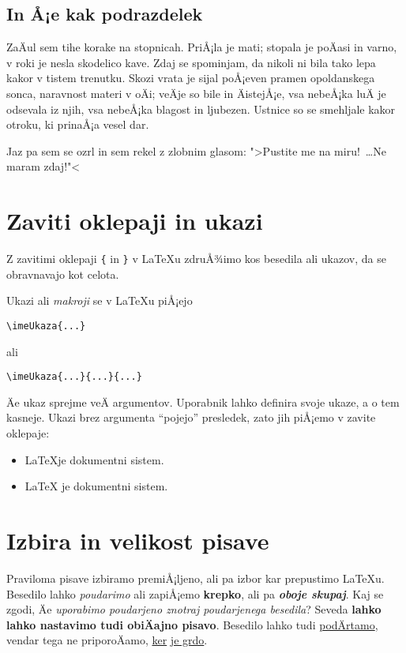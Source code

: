 \documentclass[a4paper]{article}
\begin{document}
\subsection{In Å¡e kak podrazdelek}

ZaÄul sem tihe korake na stopnicah. PriÅ¡la je mati; stopala je poÄasi in varno, v roki je
nesla skodelico kave. Zdaj se spominjam, da nikoli ni bila tako lepa kakor v tistem
trenutku. Skozi vrata je sijal poÅ¡even pramen opoldanskega sonca, naravnost materi v oÄi;
veÄje so bile in ÄistejÅ¡e, vsa nebeÅ¡ka luÄ je odsevala iz njih, vsa nebeÅ¡ka blagost in
ljubezen. Ustnice so se smehljale kakor otroku, ki prinaÅ¡a vesel dar.

Jaz pa sem se ozrl in sem rekel z zlobnim glasom: ">Pustite me na miru!~\dots Ne maram zdaj!"<

\section{Zaviti oklepaji in ukazi}

Z zavitimi oklepaji \texttt{\{} in \texttt{\}} v LaTeXu zdruÅ¾imo kos besedila ali ukazov,
da se obravnavajo kot celota.

Ukazi ali \emph{makroji} se v LaTeXu piÅ¡ejo
%
\begin{center}
  \verb|\imeUkaza{...}|
\end{center}
%
ali
%
\begin{center}
  \verb|\imeUkaza{...}{...}{...}|
\end{center}
%
Äe ukaz sprejme veÄ argumentov. Uporabnik lahko definira svoje ukaze, a o tem kasneje.
Ukazi brez argumenta ``pojejo'' presledek, zato jih piÅ¡emo v zavite oklepaje:
%
\begin{itemize}
\item \LaTeX je dokumentni sistem.
\item {\LaTeX} je dokumentni sistem.
\end{itemize}


\section{Izbira in velikost pisave}

Praviloma pisave izbiramo premiÅ¡ljeno, ali pa izbor kar prepustimo LaTeXu.
Besedilo lahko \emph{poudarimo} ali zapiÅ¡emo \textbf{krepko}, ali pa \emph{\textbf{oboje skupaj}}.
Kaj se zgodi, Äe \emph{uporabimo poudarjeno \emph{znotraj} poudarjenega besedila}?
Seveda \textbf{lahko lahko nastavimo tudi \textnormal{obiÄajno} pisavo}.
Besedilo lahko tudi \underline{podÄrtamo}, vendar tega ne priporoÄamo, \underline{ker} \underline{je grdo}.
\end{document}
